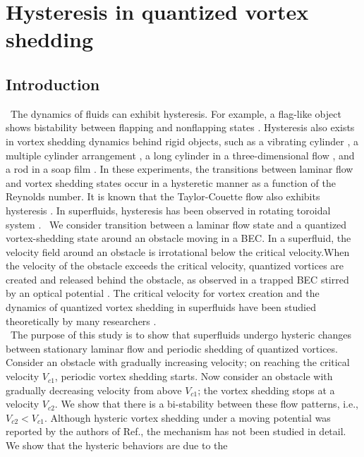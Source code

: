 \documentclass[12pt,a4paper]{report} %
\begin{document}
\chapter{Hysteresis in quantized vortex shedding}
\section{Introduction}
\ The dynamics of fluids can exhibit hysteresis. For example,
a flag-like object shows bistability between flapping and 
nonflapping states \cite{36}\cite{37}. Hysteresis also exists
in vortex shedding dynamics behind rigid objects, such
as a vibrating cylinder \cite{38}, a multiple cylinder arrangement \cite{39},
a long cylinder in a three-dimensional flow \cite{40},
and a rod in a soap film \cite{41}. In these experiments, the
transitions between laminar flow and vortex shedding states occur
in a hysteretic manner as a function of the Reynolds number.
It is known that the Taylor-Couette flow also exhibits hysteresis \cite{42}.
In superfluids, hysteresis has been observed in rotating toroidal system \cite{43} \cite{44}.
\ We consider transition between a laminar
flow state and a quantized vortex-shedding state around
an obstacle moving in a BEC. In a superfluid,
the velocity field around an obstacle is irrotational
below the critical velocity.When the velocity of the obstacle
exceeds the critical velocity, quantized vortices are
created and released behind the obstacle, as observed in a trapped BEC
stirred by an optical potential \cite{30} \cite{45} \cite{46}. The critical velocity
for vortex creation and the dynamics of quantized vortex
shedding in superfluids have been studied theoretically by many researchers \cite{19}\cite{21}\cite{22}\cite{24}\cite{31}\cite{33}\cite{35}\cite{47}\cite{48}\cite{49}\cite{50}\cite{51}\cite{52}\cite{53}\cite{54}.
\\
\ The purpose of this study is to show that superfluids
undergo hysteric changes between stationary laminar flow
and periodic shedding of quantized vortices. Consider an
obstacle with gradually increasing velocity; on reaching the
critical velocity $V_{c1}$, periodic vortex shedding starts. Now
consider an obstacle with gradually decreasing velocity from
above $V_{c1}$; the vortex shedding stops at a velocity $V_{c2}$. We
show that there is a bi-stability between these flow patterns,
i.e., $V_{c2} < V_{c1}$. Although hysteric vortex shedding under a
moving potential was reported by the authors of Ref.\cite{33},
the mechanism has not been studied in detail. 
We show that the hysteric behaviors are due to the
\end{document}
